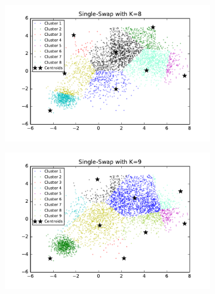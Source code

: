 \begin{figure}[htb]
\begin{subfigure}[b]{0.475\textwidth}
        \end{subfigure}
        \hfill
        \begin{subfigure}[b]{0.475\textwidth}  
            \centering 
            \includegraphics[width=\textwidth]{./figures/bigClustering_singleSwap_8.pdf}
        \end{subfigure}
        \begin{subfigure}[b]{0.475\textwidth}   
            \centering 
            \includegraphics[width=\textwidth]{./figures/bigClustering_singleSwap_9.pdf}
        \end{subfigure}
        \hfill
        \begin{subfigure}[b]{0.475\textwidth}   
            \centering 

\end{subfigure}
\end{figure}
